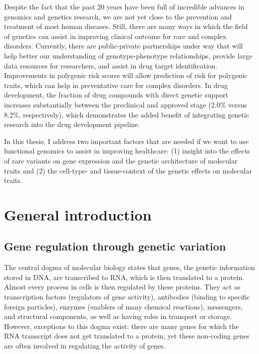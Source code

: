 Despite the fact that the past 20 years have been full of incredible advances in genomics and genetics research, we are not yet close to the prevention and treatment of most human diseases. Still, there are many ways in which the field of genetics can assist in improving clinical outcome for rare and complex disorders. Currently, there are public-private partnerships under way that will help better our understanding of genotype-phenotype relationships\cite{HomepageInternationalCommon}, provide large data resources for researchers\cite{fingennFinnGenDocumentationR32020,sudlowUKBiobankOpen2015}, and assist in drug target identification\cite{carvalho-silvaOpenTargetsPlatform2019}. Improvements in polygenic risk scores will allow prediction of risk for polygenic traits\cite{natarajanpradeepPolygenicRiskScore2017, kheraGenomewidePolygenicScores2018}, which can help in preventative care for complex disorders. In drug development, the fraction of drug compounds with direct genetic support increases substantially between the preclinical and approved stage (2.0\% versus 8.2\%, respectively\cite{nelsonSupportHumanGenetic2015}), which demonstrates the added benefit of integrating genetic research into the drug development pipeline. 


In this thesis, I address two important factors that are needed if we want to use functional genomics to assist in improving healthcare: (1) insight into the effects of rare variants on gene expression and the genetic architecture of molecular traits and (2) the cell-type- and tissue-context of the genetic effects on molecular traits.


\section{General introduction}

\subsection{Gene regulation through genetic variation}

The central dogma of molecular biology states that genes, the genetic information stored in DNA, are transcribed to RNA, which is then translated to a protein\cite{crickCentralDogmaMolecular1970}. Almost every process in cells is then regulated by these proteins. They act as transcription factors (regulators of gene activity), antibodies (binding to specific foreign particles), enzymes (enablers of many chemical reactions), messengers, and structural components, as well as having roles in transport or storage\cite{uzmanMolecularBiologyCell2003}. However, exceptions to this dogma exist: there are many genes for which the RNA transcript does not get translated to a protein, yet these non-coding genes are often involved in regulating the activity of genes\cite{shabalinaMammalianTranscriptomeFunction2004}. 


